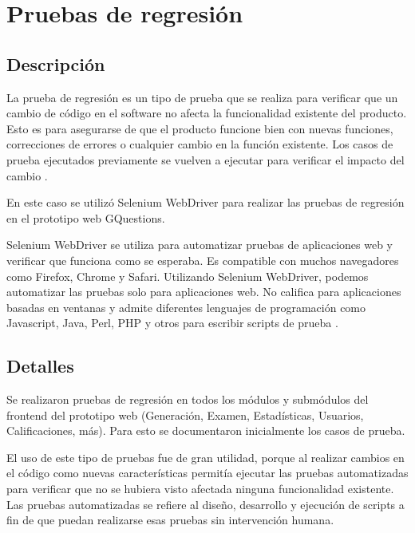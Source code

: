 \documentclass[../Main.tex]{subfiles}
\begin{document}
    \section{Pruebas de regresión}
    \subsection{Descripción}
    \begin{justify}
    La prueba de regresión es un tipo de prueba que se realiza para verificar que un cambio de código en el software no afecta la funcionalidad existente del producto. Esto es para asegurarse de que el producto funcione bien con nuevas funciones, correcciones de errores o cualquier cambio en la función existente. Los casos de prueba ejecutados previamente se vuelven a ejecutar para verificar el impacto del cambio \cite{58}. %
    
    En este caso se utilizó Selenium WebDriver para realizar las pruebas de regresión en el prototipo web GQuestions. 
    
    Selenium WebDriver se utiliza para automatizar pruebas de aplicaciones web y verificar que funciona como se esperaba. Es compatible con muchos navegadores como Firefox, Chrome y Safari. Utilizando Selenium WebDriver, podemos automatizar las pruebas solo para aplicaciones web. No califica para aplicaciones basadas en ventanas y admite diferentes lenguajes de programación como Javascript, Java, Perl, PHP y otros para escribir scripts de prueba \cite{59}. %
    
    \end{justify}
    
    \subsection{Detalles}
    \begin{justify}
    Se realizaron pruebas de regresión en todos los módulos y submódulos del frontend del prototipo web (Generación, Examen, Estadísticas, Usuarios, Calificaciones, más). Para esto se documentaron inicialmente los casos de prueba.
    
    El uso de este tipo de pruebas fue de gran utilidad, porque al realizar cambios en el código como nuevas características permitía ejecutar las pruebas automatizadas para verificar que no se hubiera visto afectada ninguna funcionalidad existente. Las pruebas automatizadas se refiere al diseño, desarrollo y ejecución de scripts a fin de que puedan realizarse esas pruebas sin intervención humana. 
    \end{justify}
    
\end{document}
